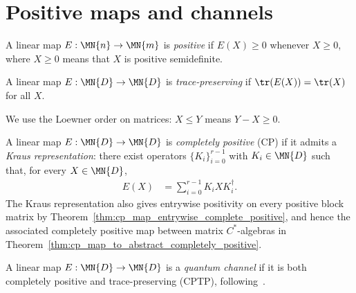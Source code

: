 \section{Positive maps and channels}

\begin{definition}\label{def:positive_map}
    \leanok
    A linear map $E : \MN{n} \to \MN{m}$ is \emph{positive}
    if $E(X) \ge 0$ whenever $X \ge 0$, where $X \ge 0$
    means that $X$ is positive semidefinite.
\end{definition}

\begin{definition}\label{def:trace_preserving}
    \leanok
    A linear map $E : \MN{D} \to \MN{D}$ is \emph{trace-preserving}
    if $\tr(E(X)) = \tr(X)$ for all $X$.
\end{definition}

\begin{remark}\leanok
    We use the Loewner order on matrices: $X \le Y$ means
    $Y - X \ge 0$.
\end{remark}

\begin{definition}\label{def:cp_map}
    \leanok
    A linear map $E : \MN{D} \to \MN{D}$ is \emph{completely positive} (CP)
    if it admits a \emph{Kraus representation}: there exist operators
    $\{K_i\}_{i=0}^{r-1}$ with $K_i \in \MN{D}$ such that, for every
    $X \in \MN{D}$,
    \begin{align}
        E(X)
        &= \sum_{i=0}^{r-1} K_i X K_i^\dagger.
        \label{eq:channel_kraus_representation}
    \end{align}
    The Kraus representation also gives entrywise positivity on every positive
    block matrix by Theorem~\ref{thm:cp_map_entrywise_complete_positive}, and hence
    the associated completely positive map between matrix $C^*$-algebras in
    Theorem~\ref{thm:cp_map_to_abstract_completely_positive}.
\end{definition}

\begin{definition}\label{def:channel}
    \leanok
    A linear map $E : \MN{D} \to \MN{D}$ is a \emph{quantum channel}
    if it is both completely positive and trace-preserving (CPTP),
    following~\cite{Wolf2012Quantum}.
\end{definition}

